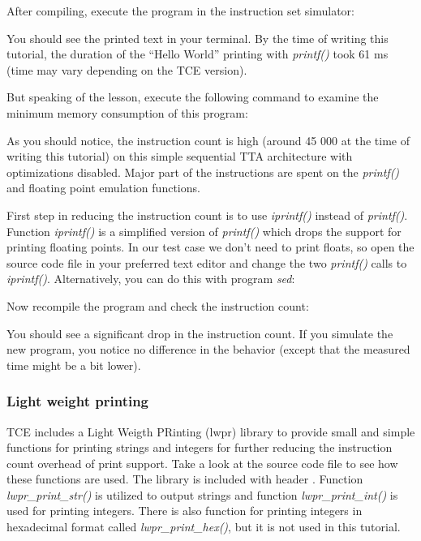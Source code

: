 \documentclass[twoside]{tceusermanual}
\begin{document}
After compiling, execute the program in the instruction set simulator:


You should see the printed text in your terminal. By the time of
writing this tutorial, the duration of the ``Hello World'' printing
with \textit{printf()} took 61 ms (time may vary depending on the TCE
version).

But speaking of the lesson, execute the following command to examine
the minimum memory consumption of this program:


As you should notice, the instruction count is high (around 45 000 at
the time of writing this tutorial) on this simple sequential TTA
architecture with optimizations disabled. Major part of the
instructions are spent on the \textit{printf()} and floating point
emulation functions.

First step in reducing the instruction count is to use
\textit{iprintf()} instead of \textit{printf()}. Function
\textit{iprintf()} is a simplified version of \textit{printf()} which
drops the support for printing floating points. In our test case we
don't need to print floats, so open the source code file
 in your preferred text editor and change the two
\textit{printf()} calls to \textit{iprintf()}. Alternatively, you can
do this with program \textit{sed}:


Now recompile the program and check the instruction count:



You should see a significant drop in the instruction count. If you
simulate the new program, you notice no difference in the behavior
(except that the measured time might be a bit lower).

\subsubsection{Light weight printing}

TCE includes a Light Weigth PRinting (lwpr) library to provide small
and simple functions for printing strings and integers for further
reducing the instruction count overhead of print support. Take a look
at the source code file  to see how these
functions are used. The library is included with header .
Function \textit{lwpr\_print\_str()} is utilized to output strings and
function \textit{lwpr\_print\_int()} is used for printing
integers. There is also function for printing integers in hexadecimal
format called \textit{lwpr\_print\_hex()}, but it is not used in this
tutorial.
\end{document}
